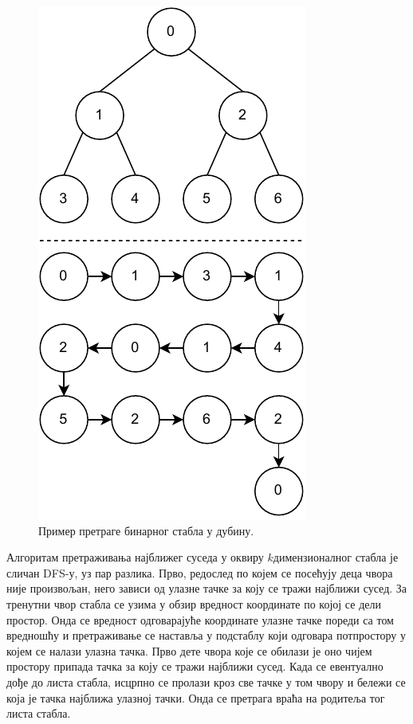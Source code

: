 \documentclass[master]{finthesis}
\newcommand*{\kdim}[1]{\texorpdfstring{$k$\Hyphdash}{k-}димензионал#1}
\begin{document}
\begin{figure}[ht]
    \centering
    \includegraphics[height=0.6\textheight]{slike/dfs_traversal}
    \caption{Пример претраге бинарног стабла у дубину.}
    \label{fig:dfs}
\end{figure}

Алгоритам претраживања најближег суседа у оквиру \kdim{ног} стабла је сличан DFS-у, уз пар разлика. Прво, редослед по којем се посећују деца чвора није произвољан, него зависи од улазне тачке за коју се тражи најближи сусед. За тренутни чвор стабла се узима у обзир вредност координате по којој се дели простор. Онда се вредност одговарајуће координате улазне тачке пореди са том вредношћу и претраживање се наставља у подстаблу који одговара потпростору у којем се налази улазна тачка. Прво дете чвора које се обилази је оно чијем простору припада тачка за коју се тражи најближи сусед. Када се евентуално дође до листа стабла, исцрпно се пролази кроз све тачке у том чвору и бележи се која је тачка најближа улазној тачки. Онда се претрага враћа на родитеља тог листа стабла.
\end{document}
